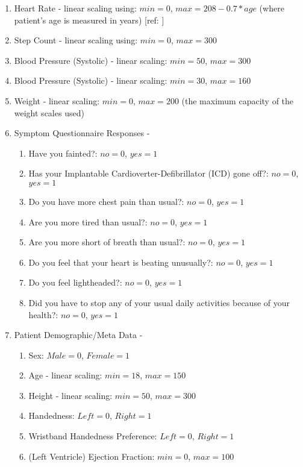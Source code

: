 \documentclass[]{article}
\begin{document}
\begin{enumerate}
	\item Heart Rate - linear scaling using: \(min = 0\), \(max = 208 - 0.7*age\) (where patient's age is measured in years) [ref: ]
	\item Step Count - linear scaling using: \(min = 0\), \(max = 300\) 
	\item Blood Pressure (Systolic) - linear scaling: \(min = 50\), \(max = 300\) 
	\item Blood Pressure (Systolic) - linear scaling: \(min = 30\), \(max = 160\) 
	\item Weight - linear scaling: \(min = 0\), \(max = 200\) (the maximum capacity of the weight scales used)
	\item Symptom Questionnaire Responses -
	\begin{enumerate}
		\item Have you fainted?: \(no = 0\), \(yes = 1\)
		\item Has your Implantable Cardioverter-Defibrillator (ICD) gone off?: \(no = 0\), \(yes = 1\)
		\item Do you have more chest pain than usual?: \(no = 0\), \(yes = 1\)
		\item Are you more tired than usual?: \(no = 0\), \(yes = 1\)
		\item Are you more short of breath than usual?: \(no = 0\), \(yes = 1\)
		\item Do you feel that your heart is beating unusually?: \(no = 0\), \(yes = 1\)
		\item Do you feel lightheaded?: \(no = 0\), \(yes = 1\)
		\item Did you have to stop any of your usual daily activities because of your health?: \(no = 0\), \(yes = 1\)
	\end{enumerate}
	\item Patient Demographic/Meta Data -
	\begin{enumerate}
		\item Sex: \(Male = 0\), \(Female = 1\)
		\item Age - linear scaling: \(min = 18\), \(max = 150\) 
		\item Height - linear scaling: \(min = 50\), \(max = 300\) 
		\item Handedness: \(Left = 0\), \(Right = 1\)
		\item Wristband Handedness Preference: \(Left = 0\), \(Right = 1\)
		\item (Left Ventricle) Ejection Fraction: \(min = 0\), \(max = 100\)

\end{enumerate}
\end{enumerate}
\end{document}
